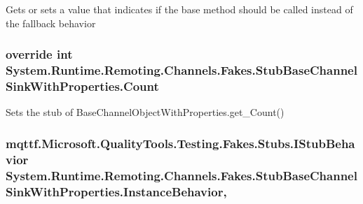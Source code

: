 Gets or sets a value that indicates if the base method should be called instead of the fallback behavior

\hypertarget{class_system_1_1_runtime_1_1_remoting_1_1_channels_1_1_fakes_1_1_stub_base_channel_sink_with_properties_a74bb27ecaa00bf76455656ade00cf52a}{
\subsubsection[{Count}]{\setlength{\rightskip}{0pt plus 5cm}override int System.\-Runtime.\-Remoting.\-Channels.\-Fakes.\-Stub\-Base\-Channel\-Sink\-With\-Properties.\-Count\hspace{0.3cm}{\ttfamily [get]}}}\label{class_system_1_1_runtime_1_1_remoting_1_1_channels_1_1_fakes_1_1_stub_base_channel_sink_with_properties_a74bb27ecaa00bf76455656ade00cf52a}


Sets the stub of Base\-Channel\-Object\-With\-Properties.\-get\-\_\-\-Count()

\hypertarget{class_system_1_1_runtime_1_1_remoting_1_1_channels_1_1_fakes_1_1_stub_base_channel_sink_with_properties_a490c34ed0df1d07479fb6221e76e93f2}{
\subsubsection[{Instance\-Behavior}]{\setlength{\rightskip}{0pt plus 5cm}mqttf.\-Microsoft.\-Quality\-Tools.\-Testing.\-Fakes.\-Stubs.\-I\-Stub\-Behavior System.\-Runtime.\-Remoting.\-Channels.\-Fakes.\-Stub\-Base\-Channel\-Sink\-With\-Properties.\-Instance\-Behavior\hspace{0.3cm}{\ttfamily [get]}, {\ttfamily [set]}}}\label{class_system_1_1_runtime_1_1_remoting_1_1_channels_1_1_fakes_1_1_stub_base_channel_sink_with_properties_a490c34ed0df1d07479fb6221e76e93f2}


